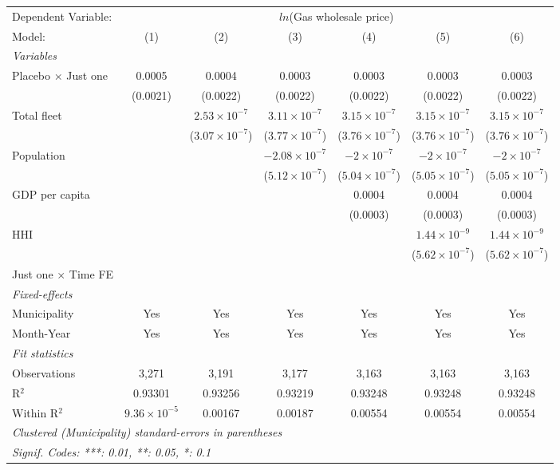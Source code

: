 \documentclass[
]{article}
\begin{document}
\begin{tabular}{lcccccc}
\tabularnewline\midrule\midrule
Dependent Variable:&\multicolumn{6}{c}{$ln$(Gas wholesale price)}\\
Model:&(1) & (2) & (3) & (4) & (5) & (6)\\
\midrule \emph{Variables}&   &   &   &   &   &  \\
Placebo $\times $ Just one & 0.0005 & 0.0004 & 0.0003 & 0.0003 & 0.0003 & 0.0003\\
  &(0.0021) & (0.0022) & (0.0022) & (0.0022) & (0.0022) & (0.0022)\\
Total fleet &    & $2.53\times 10^{-7}$ & $3.11\times 10^{-7}$ & $3.15\times 10^{-7}$ & $3.15\times 10^{-7}$ & $3.15\times 10^{-7}$\\
  &   & ($3.07\times 10^{-7}$) & ($3.77\times 10^{-7}$) & ($3.76\times 10^{-7}$) & ($3.76\times 10^{-7}$) & ($3.76\times 10^{-7}$)\\
Population &    &    & $-2.08\times 10^{-7}$ & $-2\times 10^{-7}$ & $-2\times 10^{-7}$ & $-2\times 10^{-7}$\\
  &   &    & ($5.12\times 10^{-7}$) & ($5.04\times 10^{-7}$) & ($5.05\times 10^{-7}$) & ($5.05\times 10^{-7}$)\\
GDP per capita &    &    &    & 0.0004 & 0.0004 & 0.0004\\
  &   &    &    & (0.0003) & (0.0003) & (0.0003)\\
HHI &    &    &    &    & $1.44\times 10^{-9}$ & $1.44\times 10^{-9}$\\
  &   &    &    &    & ($5.62\times 10^{-7}$) & ($5.62\times 10^{-7}$)\\
Just one $\times$ Time FE &  &  &  &  &  & \\
\midrule \emph{Fixed-effects}&   &   &   &   &   &  \\
Municipality & Yes & Yes & Yes & Yes & Yes & Yes\\
Month-Year & Yes & Yes & Yes & Yes & Yes & Yes\\
\midrule \emph{Fit statistics}&  & & & & & \\
Observations & 3,271&3,191&3,177&3,163&3,163&3,163\\
R$^2$ & 0.93301&0.93256&0.93219&0.93248&0.93248&0.93248\\
Within R$^2$ & $9.36\times 10^{-5}$&0.00167&0.00187&0.00554&0.00554&0.00554\\
\midrule\midrule\multicolumn{7}{l}{\emph{Clustered (Municipality) standard-errors in parentheses}}\\
\multicolumn{7}{l}{\emph{Signif. Codes: ***: 0.01, **: 0.05, *: 0.1}}\\
\end{tabular}
\end{document}
